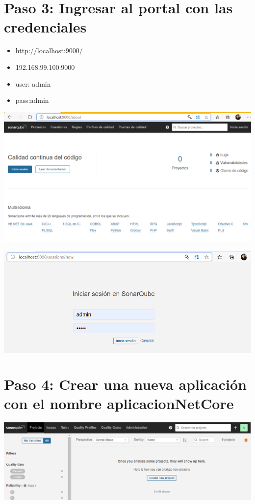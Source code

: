 \section{Paso 3: Ingresar al portal con las credenciales } 
\begin{itemize}
    \item http://localhost:9000/
    \item 192.168.99.100:9000
    \item user: admin
    \item pass:admin
\end{itemize}
\begin{center}
\includegraphics[width=\columnwidth]{images/3}\newline
\end{center}
\begin{center}
\includegraphics[width=\columnwidth]{images/4}\newline
\end{center}
\section{Paso 4: Crear una nueva aplicación con el nombre aplicacionNetCore } 
\begin{center}
\includegraphics[width=\columnwidth]{images/5}\newline
\end{center}

